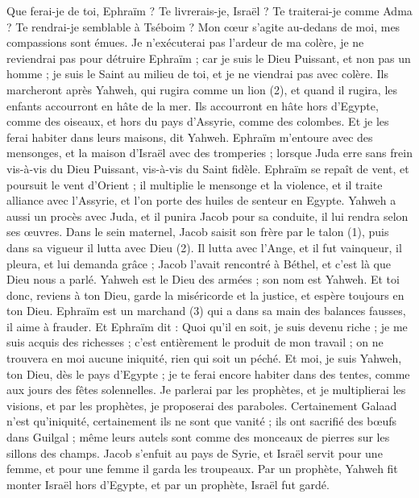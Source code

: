 \begin{multicols}{2}
Que ferai-je de toi, Ephraïm ? Te livrerais-je, Israël ? Te traiterai-je comme Adma ? Te rendrai-je semblable à Tséboim ? Mon cœur s’agite au-dedans de moi, mes compassions sont émues.
Je n'exécuterai pas l'ardeur de ma colère, je ne reviendrai pas pour détruire Ephraïm ; car je suis le Dieu Puissant, et non pas un homme ; je suis le Saint au milieu de toi, et je ne viendrai pas avec colère.
Ils marcheront après Yahweh, qui rugira comme un lion (2), et quand il rugira, les enfants accourront en hâte de la mer.
Ils accourront en hâte hors d'Egypte, comme des oiseaux, et hors du pays d'Assyrie, comme des colombes. Et je les ferai habiter dans leurs maisons, dit Yahweh.
\VerseOne{}Ephraïm m'entoure avec des mensonges, et la maison d'Israël avec des tromperies ; lorsque Juda erre sans frein vis-à-vis du Dieu Puissant, vis-à-vis du Saint fidèle.
Ephraïm se repaît de vent, et poursuit le vent d'Orient ; il multiplie le mensonge et la violence, et il traite alliance avec l'Assyrie, et l'on porte des huiles de senteur en Egypte.
Yahweh a aussi un procès avec Juda, et il punira Jacob pour sa conduite, il lui rendra selon ses œuvres.
Dans le sein maternel, Jacob saisit son frère par le talon (1), puis dans sa vigueur il lutta avec Dieu (2).
Il lutta avec l’Ange, et il fut vainqueur, il pleura, et lui demanda grâce ; Jacob l’avait rencontré à Béthel, et c’est là que Dieu nous a parlé.
Yahweh est le Dieu des armées ; son nom est Yahweh.
Et toi donc, reviens à ton Dieu, garde la miséricorde et la justice, et espère toujours en ton Dieu.
Ephraïm est un marchand (3) qui a dans sa main des balances fausses, il aime à frauder.
Et Ephraïm dit : Quoi qu'il en soit, je suis devenu riche ; je me suis acquis des richesses ; c’est entièrement le produit de mon travail ; on ne trouvera en moi aucune iniquité, rien qui soit un péché.
Et moi, je suis Yahweh, ton Dieu, dès le pays d'Egypte ; je te ferai encore habiter dans des tentes, comme aux jours des fêtes solennelles.
Je parlerai par les prophètes, et je multiplierai les visions, et par les prophètes, je proposerai des paraboles.
Certainement Galaad n'est qu'iniquité, certainement ils ne sont que vanité ; ils ont sacrifié des bœufs dans Guilgal ; même leurs autels sont comme des monceaux de pierres sur les sillons des champs.
Jacob s'enfuit au pays de Syrie, et Israël servit pour une femme, et pour une femme il garda les troupeaux.
Par un prophète, Yahweh fit monter Israël hors d'Egypte, et par un prophète, Israël fut gardé.

\end{multicols}
